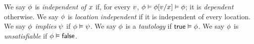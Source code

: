 




\begin{definition}
  \label{def:independent}
  We say $\phi$ is \emph{independent of $x$} if, for every
  $v$, $\phi \vDash \phi[v/x] \vDash \phi$; it is
  \emph{dependent} otherwise.
  We say $\phi$ is \emph{location independent} if it is independent of
  every location.
%
  We say
  $\phi$ \emph{implies} $\psi$ if $\phi\vDash\psi$.
  We say
  $\phi$ is a \emph{tautology} if $\mathsf{true}\vDash\phi$.
  We say
  $\phi$ is \emph{unsatisfiable} if $\phi\vDash\mathsf{false}$.
\end{definition}

